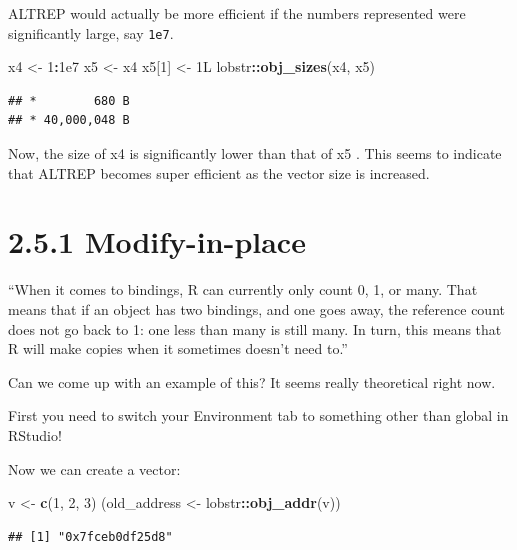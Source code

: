 \documentclass[]{book}
\newenvironment{Shaded}{\begin{snugshade}}{\end{snugshade}}
\newcommand{\DecValTok}[1]{\textcolor[rgb]{0.00,0.00,0.81}{#1}}
\newcommand{\FloatTok}[1]{\textcolor[rgb]{0.00,0.00,0.81}{#1}}
\newcommand{\KeywordTok}[1]{\textcolor[rgb]{0.13,0.29,0.53}{\textbf{#1}}}
\newcommand{\NormalTok}[1]{#1}
\newcommand{\OperatorTok}[1]{\textcolor[rgb]{0.81,0.36,0.00}{\textbf{#1}}}
\newcommand{\StringTok}[1]{\textcolor[rgb]{0.31,0.60,0.02}{#1}}
\begin{document}
ALTREP would actually be more efficient if the numbers represented were significantly large, say \texttt{1e7}.

\begin{Shaded}
\begin{Highlighting}[]
\NormalTok{x4 <-}\StringTok{ }\DecValTok{1}\OperatorTok{:}\FloatTok{1e7}
\NormalTok{x5 <-}\StringTok{ }\NormalTok{x4}
\NormalTok{x5[}\DecValTok{1}\NormalTok{] <-}\StringTok{ }\NormalTok{1L}
\NormalTok{lobstr}\OperatorTok{::}\KeywordTok{obj_sizes}\NormalTok{(x4, x5)}
\end{Highlighting}
\end{Shaded}

\begin{verbatim}
## *        680 B
## * 40,000,048 B
\end{verbatim}

Now, the size of x4 is significantly lower than that of x5 . This seems to indicate that ALTREP becomes super efficient as the vector size is increased.

\hypertarget{modify-in-place}{%
\section*{2.5.1 Modify-in-place}\label{modify-in-place}}

``When it comes to bindings, R can currently only count 0, 1, or many. That means that if an object has two bindings, and one goes away, the reference count does not go back to 1: one less than many is still many. In turn, this means that R will make copies when it sometimes doesn't need to.''

Can we come up with an example of this? It seems really theoretical right now.

First you need to switch your Environment tab to something other than global in RStudio!

Now we can create a vector:

\begin{Shaded}
\begin{Highlighting}[]
\NormalTok{v <-}\StringTok{ }\KeywordTok{c}\NormalTok{(}\DecValTok{1}\NormalTok{, }\DecValTok{2}\NormalTok{, }\DecValTok{3}\NormalTok{)}
\NormalTok{(old_address <-}\StringTok{ }\NormalTok{lobstr}\OperatorTok{::}\KeywordTok{obj_addr}\NormalTok{(v))}
\end{Highlighting}
\end{Shaded}

\begin{verbatim}
## [1] "0x7fceb0df25d8"
\end{verbatim}
\end{document}
